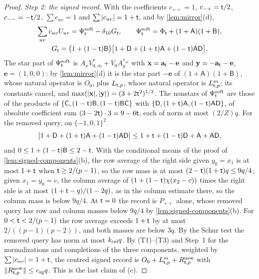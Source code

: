 \begin{proof}
\emph{Step 2: the signed record.} With the coefficients $c_{++}=1$,
$c_{-+}=\mathsf t/2$, $c_{--}=-\mathsf t/2$, $\sum c_{uv}=1$ and $\sum|c_{uv}|=1+\mathsf t$, and
by \cref{lem:mirror}(d),
\[
\begin{gathered}
 \sum_{uv}c_{uv}U_{uv}=\Psi^{\rm soft}_\mathsf t-\delta_{10}G_\mathsf t,\qquad
 \Psi^{\rm soft}_\mathsf t=\Phi_\mathsf t+(1+\mathsf A)(1+\mathsf B),\\
 G_\mathsf t=\bigl(1+(1-\mathsf t)\mathsf B\bigr)\bigl[1+\mathsf D+(1+\mathsf t)\mathsf A
 +(1-\mathsf t)\mathsf A\mathsf D\bigr].
\end{gathered}
\]
The star part of $\Psi^{\rm soft}_\mathsf t$ is $A_xV^*_{0,m}+V_0A_y^{*_m}$ with
$\mathbf x=\mathbf a_\mathsf t-\mathbf e$ and $\mathbf y=-\mathbf a_\mathsf t-\mathbf e$,
$\mathbf e=(1,0,0)$: by \cref{lem:mirror}(d) it is the star part $-\mathbf e$ of
$(1+\mathsf A)(1+\mathsf B)$, whose natural operator is $O_0$, plus $L_{\mathsf t,p}$,
whose natural operator is $L^m_{\mathsf t,p}$; its constants cancel, and
$\max(|\mathbf x|,|\mathbf y|)=(3+2\mathsf t^2)^{1/2}$. The nonstars of
$\Psi^{\rm soft}_\mathsf t$ are those of the products of $\{\mathsf C,(1-\mathsf t)\mathsf B,
(1-\mathsf t)\mathsf B\mathsf C\}$ with $\{\mathsf D,(1+\mathsf t)\mathsf A,(1-\mathsf t)\mathsf A\mathsf D\}$,
of absolute coefficient sum $(3-2\mathsf t)\cdot3=9-6\mathsf t$, each of norm at most
$(2/Z)q$. For the removed query, on $\{-1,0,1\}^2$
\[
 \bigl|1+\mathsf D+(1+\mathsf t)\mathsf A+(1-\mathsf t)\mathsf A\mathsf D\bigr|
 \le1+\mathsf t+(1-\mathsf t)\mathsf D+\mathsf A+\mathsf A\mathsf D ,
\]
and $0\le1+(1-\mathsf t)\mathsf B\le2-\mathsf t$. With the conditional means of the
proof of \cref{lem:signed-components}(b), the row average of the right side
given $y_0=x_1$ is at most $1+\mathsf t$ when $\mathsf t\ge2/(p-1)$, so the row mass is
at most $(2-\mathsf t)(1+\mathsf t)q\le9q/4$; given $x_1=y_0=c$, the column average of
$(1+(1-\mathsf t)\chi(x_2-c))$ times the right side is at most
$(1+\mathsf t-q)/(1-2q)$, as in the column estimate there, so the column mass is
below $9q/4$. At $\mathsf t=0$ the record is $P_{++}$ alone, whose removed query
has row and column masses below $9q/4$ by \cref{lem:signed-components}(b). For
$0<\mathsf t<2/(p-1)$ the row average exceeds $1+\mathsf t$ by at most
$2/((p-1)(p-2))$, and both masses are below $3q$. By the Schur test the
removed query has norm at most $k_{\rm col}q$. By (T1)--(T3) and Step~1 for the normalizations and
completions of the three components, weighted by $\sum|c_{uv}|=1+\mathsf t$, the
centred signed record is $O_0+L^m_{\mathsf t,p}+R^{\rm new}_{\mathsf t,p}$ with
$\|R^{\rm new}_{\mathsf t,p}\|\le e_{\rm sg}q$. This is the last claim of (c).


\end{proof}

